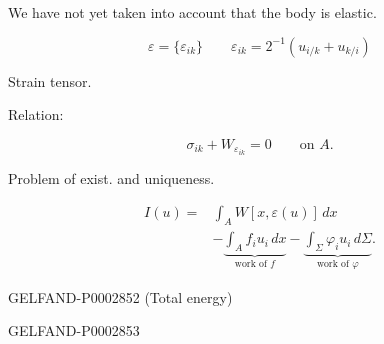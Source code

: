 We have not yet taken into account that the body is elastic.

\begin{center}\end{center}

\begin{equation*}\varepsilon=\{\varepsilon_{ik}\}\qquad\varepsilon_{ik}=2^{-1}(u_{i/k}+u_{k/i})\end{equation*}

\begin{center}Strain tensor.\end{center}





Relation:

\begin{equation*}\sigma_{ik}+W_{\varepsilon_{ik}}=0\qquad\text{on }A.\end{equation*}

Problem of exist. and uniqueness.

\begin{equation*}\begin{aligned}
I (u)={}&\int_A W[x,\varepsilon (u)]\, dx\\
&-\underbrace{\int_A f_i u_i\, dx}_{\text{work of }f}
-\underbrace{\int_\Sigma\varphi_i u_i\, d\Sigma}_{\text{work of }\varphi}.
\end{aligned}\end{equation*}

\begin{GelfandAdjacentEvidence}{GELFAND-P000285}{2}
(Total energy)

\end{GelfandAdjacentEvidence}


\begin{GelfandAdjacentEvidence}{GELFAND-P000285}{3}

\end{GelfandAdjacentEvidence}


